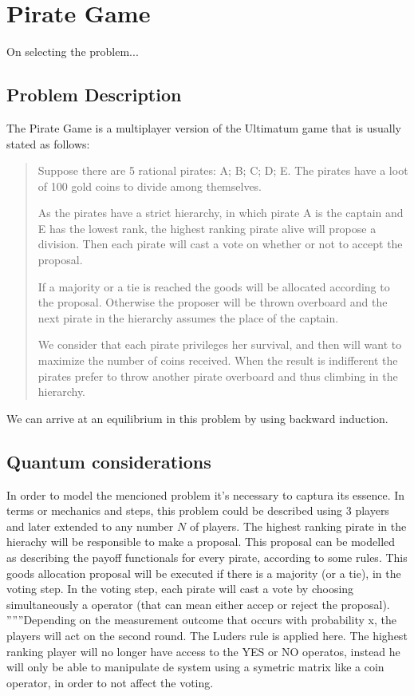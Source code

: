 \section{Pirate Game}
\label{sec:pirate}

\begin{emph}
On selecting the problem...
\end{emph}


\subsection{Problem Description}
\label{subsec:description}

The Pirate Game is a multiplayer version of the Ultimatum game that is usually stated as follows:

\begin{quotation}
Suppose there are 5 rational pirates: A; B; C; D; E. The pirates have a  loot of 100 gold coins to divide among themselves.


As the pirates have a strict hierarchy, in which pirate A is the captain and E has the lowest rank, the highest ranking pirate alive will propose a division. Then each pirate will cast a vote on whether or not to accept the proposal. 

If a majority or a tie is reached the goods will be allocated according to the proposal. Otherwise the proposer will be thrown overboard and the next pirate in the hierarchy assumes the place of the captain. 

We consider that each pirate privileges her survival, and then will want to maximize the number of coins received. When the result is indifferent the pirates prefer to throw another pirate overboard and thus climbing in the hierarchy. 
\end{quotation}

We can arrive at an equilibrium in this problem by using backward induction. 


\subsection{Quantum considerations}
\label{subsec:description_2}

In order to model the mencioned problem it's necessary to captura its essence.
In terms or mechanics and steps, this problem could be described using 3 players and later extended to any number $N$ of players. The highest ranking pirate in the hierachy will be responsible to make a proposal. This proposal can be modelled as describing the payoff functionals for every pirate, according to some rules. This goods allocation proposal will be executed if there is a majority (or a tie), in the voting step. In the voting step, each pirate will cast a vote by choosing simultaneously a operator (that can mean either accep or reject the proposal).
''''''Depending on the measurement outcome that occurs with probability x, the players will act on the second round. The Luders rule is applied here. The highest ranking player will no longer have access to the YES or NO operatos, instead he will only be able to manipulate de system using a symetric matrix like a coin operator, in order to not affect the voting.

